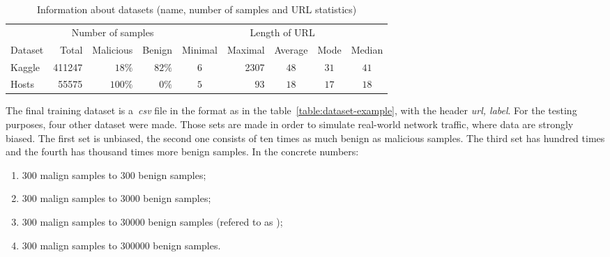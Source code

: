 \begin{table}[htb]
    \centering

    {\small
    \begin{tabular}{lrrrcrccc}
        \toprule
                    & \multicolumn{3}{c}{Number of samples}         & \multicolumn{5}{c}{Length of URL} \\ \cmidrule(lr){2-4} \cmidrule(lr){5-9}
        Dataset     & Total         & Malicious     & Benign        & Minimal & Maximal     & Average   & Mode      & Median \\
        \midrule
        Kaggle      & \num{411247} & \( 18\% \)    & \( 82\% \)     & \( 6 \) & \num{2307}  & \( 48 \)  & \( 31 \)  & \( 41 \) \\
        Hosts       & \num{55575}  & \( 100\% \)   & \( 0\% \)      & \( 5 \) & \( 93 \)    & \( 18 \)  & \( 17 \)  & \( 18 \) \\
        \bottomrule
    \end{tabular}
    }

    \caption{Information about datasets (name, number of samples and URL statistics)}
    \label{table:dataset-statistics}
\end{table}
\FloatBarrier

The final training dataset is a~\textit{csv} file in the format as in the table~\ref{table:dataset-example}, with the header \textit{url, label}.
For the testing purposes, four other dataset were made.
Those sets are made in order to simulate real-world network traffic, where data are strongly biased.
The first set is unbiased, the second one consists of ten times as much benign as malicious samples.
The third set has hundred times and the fourth has thousand times more benign samples.
In the concrete numbers:
\begin{enumerate}
    \item \( 300 \) malign samples to \num{300} benign samples;
    \item \( 300 \) malign samples to \num{3000} benign samples;
    \item \( 300 \) malign samples to \num{30000} benign samples (refered to as );
    \item \( 300 \) malign samples to \num{300000} benign samples.
\end{enumerate}

